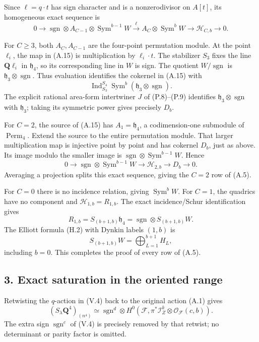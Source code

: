 \documentclass[
  10pt,
]{article}
\begin{document}
Since \(\ell=q\cdot t\) has sign character and is a nonzerodivisor on
\(A[t]\), its homogeneous exact sequence is \[
0\to
\operatorname{sgn}\otimes A_{C-1}\otimes
\operatorname{Sym}^{b-1}W
\xrightarrow{\ \ell\ }
A_C\otimes\operatorname{Sym}^{b}W
\to\mathcal H_{C,b}\to0.
\tag{A.15}
\]

For \(C\ge3\), both \(A_C,A_{C-1}\) are the four-point permutation
module. At the point \(\ell_i\), the map in (A.15) is multiplication by
\(\ell_i\cdot t\). The stabilizer \(S_3\) fixes the line
\(\mathbf Q\ell_i\) in \(\mathfrak h_4\), so its corresponding line in
\(W\) is sign. The quotient \(W/\operatorname{sgn}\) is
\(\mathfrak h_3\otimes\operatorname{sgn}\). Thus evaluation identifies
the cokernel in (A.15) with \[
\operatorname{Ind}_{S_3}^{S_4}
\operatorname{Sym}^b(\mathfrak h_3\otimes\operatorname{sgn}).
\] The explicit rational area-form intertwiner \(J\) of (P.8)--(P.9)
identifies \(\mathfrak h_3\otimes\operatorname{sgn}\) with
\(\mathfrak h_3\); taking its symmetric power gives precisely \(D_b\).

For \(C=2\), the source of (A.15) has \(A_1=\mathfrak h_4\), a
codimension-one submodule of \(\operatorname{Perm}_4\). Extend the
source to the entire permutation module. That larger multiplication map
is injective point by point and has cokernel \(D_b\), just as above. Its
image modulo the smaller image is
\(\operatorname{sgn}\otimes\operatorname{Sym}^{b-1}W\). Hence \[
0\to\operatorname{sgn}\otimes\operatorname{Sym}^{b-1}W
\to\mathcal H_{2,b}\to D_b\to0.
\] Averaging a projection splits this exact sequence, giving the \(C=2\)
row of (A.5).

For \(C=0\) there is no incidence relation, giving
\(\operatorname{Sym}^bW\). For \(C=1\), the quadrics have no component
and \(\mathcal H_{1,b}=R_{1,b}\). The exact incidence/Schur
identification gives \[
R_{1,b}=S_{(b+1,b)}\mathfrak h_4
=\operatorname{sgn}\otimes S_{(b+1,b)}W.
\] The Elliott formula (H.2) with Dynkin labels \((1,b)\) is \[
S_{(b+1,b)}W=\bigoplus_{L=1}^{b+1}H_L,
\] including \(b=0\). This completes the proof of every row of (A.5).

\subsection{3. Exact saturation in the oriented
range}\label{exact-saturation-in-the-oriented-range}

Retwisting the \(q\)-action in (V.4) back to the original action (A.1)
gives \[
(S_\lambda\mathbf Q^4)_{(n^4)}
\simeq\operatorname{sgn}^{d}\otimes
H^0(\mathcal F,\pi^*\mathcal I_Z^k\otimes\mathcal O_{\mathcal F}(c,b)).
\tag{A.16}
\] The extra sign \(\operatorname{sgn}^{c}\) of (V.4) is precisely
removed by that retwist; no determinant or parity factor is omitted.
\end{document}
